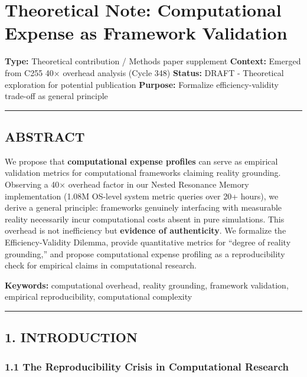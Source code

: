 \documentclass[
]{article}
\author{}
\date{}
\begin{document}
\section{Theoretical Note: Computational Expense as Framework
Validation}\label{theoretical-note-computational-expense-as-framework-validation}

\textbf{Type:} Theoretical contribution / Methods paper supplement
\textbf{Context:} Emerged from C255 40× overhead analysis (Cycle 348)
\textbf{Status:} DRAFT - Theoretical exploration for potential
publication \textbf{Purpose:} Formalize efficiency-validity trade-off as
general principle

\begin{center}\rule{0.5\linewidth}{0.5pt}\end{center}

\subsection{ABSTRACT}\label{abstract}

We propose that \textbf{computational expense profiles} can serve as
empirical validation metrics for computational frameworks claiming
reality grounding. Observing a 40× overhead factor in our Nested
Resonance Memory implementation (1.08M OS-level system metric queries
over 20+ hours), we derive a general principle: frameworks genuinely
interfacing with measurable reality necessarily incur computational
costs absent in pure simulations. This overhead is not inefficiency but
\textbf{evidence of authenticity}. We formalize the Efficiency-Validity
Dilemma, provide quantitative metrics for ``degree of reality
grounding,'' and propose computational expense profiling as a
reproducibility check for empirical claims in computational research.

\textbf{Keywords:} computational overhead, reality grounding, framework
validation, empirical reproducibility, computational complexity

\begin{center}\rule{0.5\linewidth}{0.5pt}\end{center}

\subsection{1. INTRODUCTION}\label{introduction}

\subsubsection{1.1 The Reproducibility Crisis in Computational
Research}\label{the-reproducibility-crisis-in-computational-research}
\end{document}
